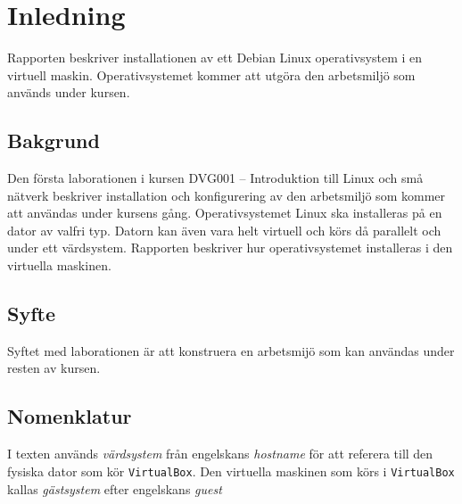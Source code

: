 %

\section{Inledning}\label{inledning}
Rapporten beskriver installationen av ett Debian Linux operativsystem i en
virtuell maskin. Operativsystemet kommer att utgöra den arbetsmiljö som används
under kursen.


\subsection{Bakgrund}
Den första laborationen i kursen DVG001 -- Introduktion till Linux och små
nätverk beskriver installation och konfigurering av den arbetsmiljö som kommer
att användas under kursens gång. Operativsystemet Linux ska installeras på en
dator av valfri typ.  Datorn kan även vara helt virtuell och körs då parallelt
och under ett värdsystem. Rapporten beskriver hur operativsystemet installeras
i den virtuella maskinen.


\subsection{Syfte}
Syftet med laborationen är att konstruera en arbetsmijö som kan användas under
resten av kursen.


\subsection{Nomenklatur}
I texten används \emph{värdsystem} från engelskans \emph{hostname} för att
referera till den fysiska dator som kör \texttt{VirtualBox}.
Den virtuella maskinen som körs i \texttt{VirtualBox} kallas \emph{gästsystem}
efter engelskans \emph{guest} 
